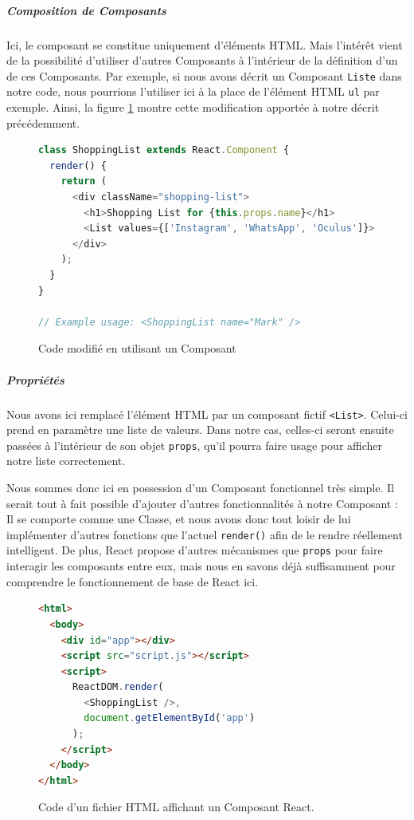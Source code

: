 			\subparagraph{Composition de Composants}

			Ici, le composant se constitue uniquement d'éléments HTML. Mais l'intérêt vient de la possibilité d'utiliser d'autres Composants à l'intérieur de la définition d'un de ces Composants. Par exemple, si nous avons décrit un Composant \texttt{Liste} dans notre code, nous pourrions l'utiliser ici à la place de l'élément HTML \texttt{ul} par exemple. Ainsi, la figure \ref{analyse_composant_react_2} montre cette modification apportée à notre décrit précédemment. 

			\begin{figure}[!h]
				\begin{lstlisting}[language=JavaScript]
class ShoppingList extends React.Component {
  render() {
    return (
      <div className="shopping-list">
        <h1>Shopping List for {this.props.name}</h1>
        <List values={['Instagram', 'WhatsApp', 'Oculus']}>
      </div>
    );
  }
}

// Example usage: <ShoppingList name="Mark" /> \end{lstlisting}
				\caption{Code modifié en utilisant un Composant}
				\label{analyse_composant_react_2}
			\end{figure}

			\subparagraph{Propriétés}

			Nous avons ici remplacé l'élément HTML par un composant fictif \texttt{<List>}. Celui-ci prend en paramètre une liste de valeurs. Dans notre cas, celles-ci seront ensuite passées à l'intérieur de son objet \texttt{props}, qu'il pourra faire usage pour afficher notre liste correctement.

			Nous sommes donc ici en possession d'un Composant fonctionnel très simple. Il serait tout à fait possible d'ajouter d'autres fonctionnalités à notre Composant : Il se comporte comme une Classe, et nous avons donc tout loisir de lui implémenter d'autres fonctions que l'actuel \texttt{render()} afin de le rendre réellement intelligent. De plus, React propose d'autres mécanismes que \texttt{props} pour faire interagir les composants entre eux, mais nous en savons déjà suffisamment pour comprendre le fonctionnement de base de React ici.

			\begin{figure}[!h]
				\begin{lstlisting}[language=HTML]
<html>
  <body>
    <div id="app"></div>
    <script src="script.js"></script>
    <script>
      ReactDOM.render(
        <ShoppingList />,
        document.getElementById('app')
      );
    </script>
  </body>
</html> \end{lstlisting}
				\caption{Code d'un fichier HTML affichant un Composant React.}
				\label{analyse_composant_react_3}
			\end{figure}

